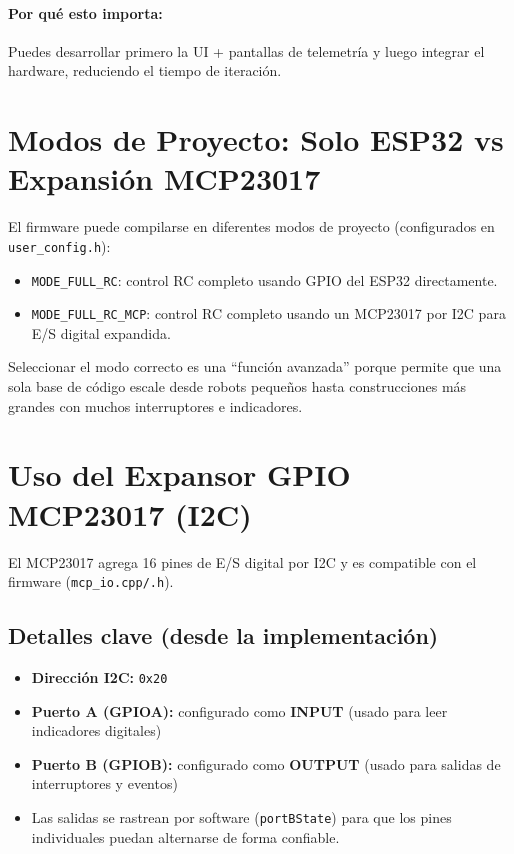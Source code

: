 \paragraph{Por qué esto importa:}
Puedes desarrollar primero la UI + pantallas de telemetría y luego integrar el hardware, reduciendo el tiempo de iteración.

\section{Modos de Proyecto: Solo ESP32 vs Expansión MCP23017}
\label{sec:project-modes}

El firmware puede compilarse en diferentes modos de proyecto (configurados en \texttt{user\_config.h}):

\begin{itemize}
    \item \texttt{MODE\_FULL\_RC}: control RC completo usando GPIO del ESP32 directamente.
    \item \texttt{MODE\_FULL\_RC\_MCP}: control RC completo usando un MCP23017 por I2C para E/S digital expandida.
\end{itemize}

Seleccionar el modo correcto es una ``función avanzada'' porque permite que una sola base de código escale desde robots pequeños
hasta construcciones más grandes con muchos interruptores e indicadores.

\section{Uso del Expansor GPIO MCP23017 (I2C)}
\label{sec:mcp23017}

El MCP23017 agrega 16 pines de E/S digital por I2C y es compatible con el firmware (\texttt{mcp\_io.cpp/.h}).

\subsection{Detalles clave (desde la implementación)}
\begin{itemize}
    \item \textbf{Dirección I2C:} \texttt{0x20}
    \item \textbf{Puerto A (GPIOA):} configurado como \textbf{INPUT} (usado para leer indicadores digitales)
    \item \textbf{Puerto B (GPIOB):} configurado como \textbf{OUTPUT} (usado para salidas de interruptores y eventos)
    \item Las salidas se rastrean por software (\texttt{portBState}) para que los pines individuales puedan alternarse de forma confiable.
\end{itemize}


